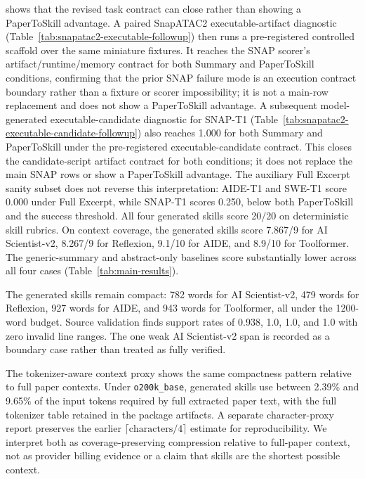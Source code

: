 shows that the revised task contract can close rather than showing a
PaperToSkill advantage. A paired SnapATAC2 executable-artifact diagnostic
(Table~\ref{tab:snapatac2-executable-followup}) then runs a pre-registered
controlled scaffold over the same miniature fixtures. It reaches the SNAP
scorer's artifact/runtime/memory contract for both Summary and PaperToSkill
conditions, confirming that the prior SNAP failure mode is an execution
contract boundary rather than a fixture or scorer impossibility; it is not a
main-row replacement and does not show a PaperToSkill advantage. A subsequent
model-generated executable-candidate diagnostic for SNAP-T1
(Table~\ref{tab:snapatac2-executable-candidate-followup}) also reaches 1.000
for both Summary and PaperToSkill under the pre-registered executable-candidate
contract. This closes the candidate-script artifact contract for both
conditions; it does not replace the main SNAP rows or show a PaperToSkill
advantage. The auxiliary Full Excerpt sanity subset does not reverse this
interpretation: AIDE-T1 and SWE-T1 score 0.000 under Full Excerpt, while
SNAP-T1 scores 0.250, below both PaperToSkill and the success threshold.
All four generated skills score 20/20 on deterministic skill rubrics. On context
coverage, the generated skills score 7.867/9 for AI Scientist-v2, 8.267/9 for
Reflexion, 9.1/10 for AIDE, and 8.9/10 for Toolformer. The generic-summary and
abstract-only baselines score substantially lower across all four cases
(Table~\ref{tab:main-results}).

The generated skills remain compact: 782 words for AI Scientist-v2, 479 words
for Reflexion, 927 words for AIDE, and 943 words for Toolformer, all under the
1200-word budget. Source validation finds support rates of 0.938, 1.0, 1.0,
and 1.0 with zero invalid line ranges. The one weak AI Scientist-v2 span is
recorded as a boundary case rather than treated as fully verified.

The tokenizer-aware context proxy shows the same compactness pattern relative
to full paper contexts. Under \texttt{o200k\_base}, generated skills use between
2.39\% and 9.65\% of the input tokens required by full extracted paper text,
with the full tokenizer table retained in the package artifacts. A separate
character-proxy report preserves the earlier
$\lceil\mathrm{characters}/4\rceil$ estimate for reproducibility. We interpret
both as coverage-preserving compression relative to full-paper context, not as
provider billing evidence or a claim that skills are the shortest possible
context.

